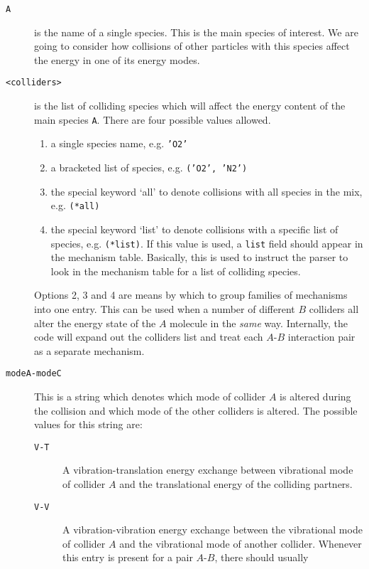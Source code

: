 \begin{description}
\item[\texttt{A}] is the name of a single species. This is the main species of interest.
                  We are going to consider how collisions of other particles with this
                  species affect the energy in one of its energy modes.
\item[\texttt{<colliders>}] is the list of colliding species which will affect the
                  energy content of the main species \texttt{A}. There are four possible
                  values allowed.
  \begin{enumerate}
  \item a single species name, e.g. \texttt{'O2'}
  \item a bracketed list of species, e.g. \texttt{('O2', 'N2')}
  \item the special keyword `all' to denote collisions with all species in the mix, e.g. \texttt{(*all)}
  \item the special keyword `list' to denote collisions with a specific list of species, e.g. 
        \texttt{(*list)}. If this value is used, a \texttt{list} field should appear in
        the mechanism table. Basically, this is used to instruct the parser to look in the
        mechanism table for a list of colliding species.
  \end{enumerate}
  Options 2, 3 and 4 are means by which to group families of mechanisms into one entry.
  This can be used when a number of different $B$ colliders all alter the energy state
  of the $A$ molecule in the \emph{same} way. Internally, the code will expand out
  the colliders list and treat each $A$-$B$ interaction pair as a separate mechanism.
\item[\texttt{modeA-modeC}] This is a string which denotes which mode of collider $A$ is altered
  during the collision and which mode of the other colliders is altered.
  The possible values for this string are:
  \begin{description}
  \item[\texttt{V-T}] A vibration-translation energy exchange between vibrational mode of 
                      collider $A$ and the translational energy of the colliding partners.
  \item[\texttt{V-V}] A vibration-vibration energy exchange between the vibrational mode
                      of collider $A$ and the vibrational mode of another collider.
                      Whenever this entry is present for a pair $A$-$B$, there should usually

\end{description}
\end{description}

